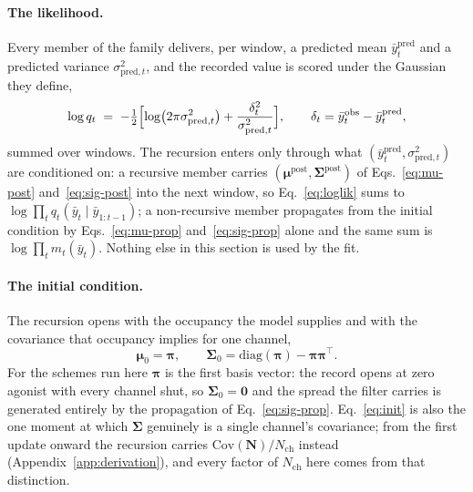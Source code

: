 \paragraph{The likelihood.} Every member of the family delivers, per window, a predicted mean
$\bar y^{\mathrm{pred}}_t$ and a predicted variance $\sigma^2_{\mathrm{pred},t}$, and the recorded
value is scored under the Gaussian they define,
\begin{equation}
  \log q_t \;=\; -\tfrac{1}{2}\Bigl[
    \log\bigl(2\pi\sigma^2_{\mathrm{pred},t}\bigr)
    + \frac{\delta_t^2}{\sigma^2_{\mathrm{pred},t}}\Bigr],
  \qquad
  \delta_t=\bar y^{\mathrm{obs}}_t-\bar y^{\mathrm{pred}}_t,
  \label{eq:loglik}
\end{equation}
summed over windows. The recursion enters only through what
$(\bar y^{\mathrm{pred}}_t,\sigma^2_{\mathrm{pred},t})$ are conditioned on: a recursive member
carries $(\boldsymbol{\mu}^{\mathrm{post}},\boldsymbol{\Sigma}^{\mathrm{post}})$ of
Eqs.~\ref{eq:mu-post} and~\ref{eq:sig-post} into the next window, so Eq.~\ref{eq:loglik} sums to
$\log\prod_t q_t(\bar y_t\mid\bar y_{1:t-1})$; a non-recursive member propagates from the initial
condition by Eqs.~\ref{eq:mu-prop} and~\ref{eq:sig-prop} alone and the same sum is
$\log\prod_t m_t(\bar y_t)$. Nothing else in this section is used by the fit.

\paragraph{The initial condition.} The recursion opens with the occupancy the model supplies and
with the covariance that occupancy implies for one channel,
\begin{equation}
  \boldsymbol{\mu}_0 = \boldsymbol{\pi},
  \qquad
  \boldsymbol{\Sigma}_0 = \mathrm{diag}(\boldsymbol{\pi})-\boldsymbol{\pi}\boldsymbol{\pi}^\top .
  \label{eq:init}
\end{equation}
For the schemes run here $\boldsymbol{\pi}$ is the first basis vector: the record opens at zero agonist
with every channel shut, so $\boldsymbol{\Sigma}_0=\boldsymbol{0}$ and the spread the filter carries is generated
entirely by the propagation of Eq.~\ref{eq:sig-prop}. Eq.~\ref{eq:init} is also the one moment at
which $\boldsymbol{\Sigma}$ genuinely is a single channel's covariance; from the first update onward the
recursion carries $\mathrm{Cov}(\mathbf{N})/N_{\mathrm{ch}}$ instead
(Appendix~\ref{app:derivation}), and every factor of $N_{\mathrm{ch}}$ here comes from that
distinction.

